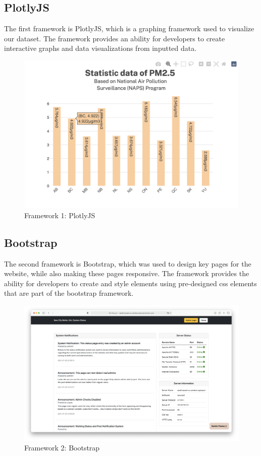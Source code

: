 \documentclass[12pt, letterpaper]{article}
\begin{document}
\subsection*{PlotlyJS}
The first framework is PlotlyJS, which is a graphing framework used to visualize our dataset. The framework provides an ability for developers to create interactive graphs and data visualizations from inputted data.
\begin{figure}[htbp]
	\centering
	\includegraphics[width=\textwidth]{images/23-plotlyjs.png}
	\caption{Framework 1: PlotlyJS}
 \end{figure}

\newpage
 \subsection*{Bootstrap}
 The second framework is Bootstrap, which was used to design key pages for the website, while also making these pages responsive. The framework provides the ability for developers to create and style elements using pre-designed css elements that are part of the bootstrap framework.
 \begin{figure}[htbp]
	\centering
	\includegraphics[width=\textwidth]{images/23-bootstrap.png}
	\caption{Framework 2: Bootstrap}
 \end{figure}
\end{document}
